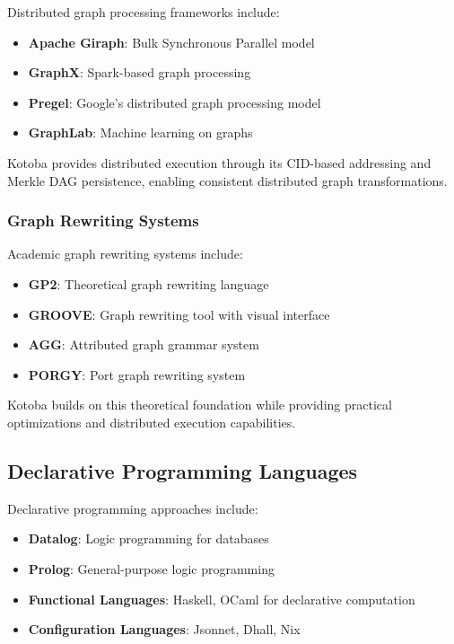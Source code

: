 \documentclass[11pt,a4paper]{article}
\begin{document}
Distributed graph processing frameworks include:
\begin{itemize}
\item \textbf{Apache Giraph}: Bulk Synchronous Parallel model
\item \textbf{GraphX}: Spark-based graph processing
\item \textbf{Pregel}: Google's distributed graph processing model
\item \textbf{GraphLab}: Machine learning on graphs
\end{itemize}

Kotoba provides distributed execution through its CID-based addressing and Merkle DAG persistence, enabling consistent distributed graph transformations.

\subsubsection{Graph Rewriting Systems}
\label{subsubsec:rewriting_systems}

Academic graph rewriting systems include:
\begin{itemize}
\item \textbf{GP2}: Theoretical graph rewriting language
\item \textbf{GROOVE}: Graph rewriting tool with visual interface
\item \textbf{AGG}: Attributed graph grammar system
\item \textbf{PORGY}: Port graph rewriting system
\end{itemize}

Kotoba builds on this theoretical foundation while providing practical optimizations and distributed execution capabilities.

\subsection{Declarative Programming Languages}
\label{subsec:declarative}

Declarative programming approaches include:
\begin{itemize}
\item \textbf{Datalog}: Logic programming for databases
\item \textbf{Prolog}: General-purpose logic programming
\item \textbf{Functional Languages}: Haskell, OCaml for declarative computation
\item \textbf{Configuration Languages}: Jsonnet, Dhall, Nix
\end{itemize}
\end{document}
